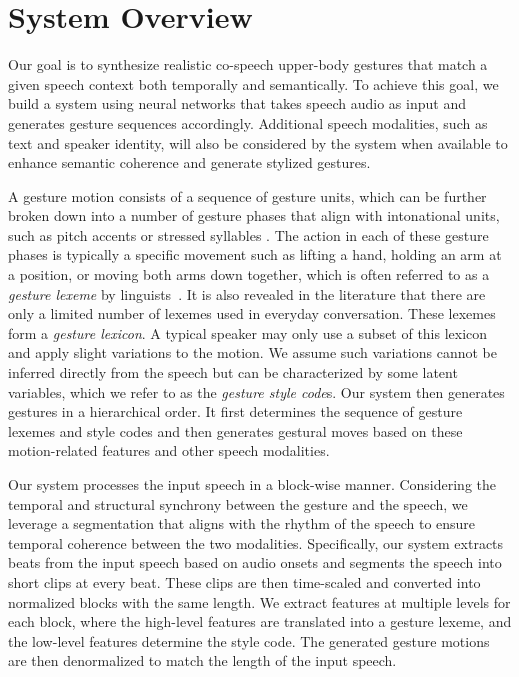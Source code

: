 \section{System Overview}
\label{sec:system_overview}
Our goal is to synthesize realistic co-speech upper-body gestures that match a given speech context both temporally and semantically. To achieve this goal, we build a system using neural networks that takes speech audio as input and generates gesture sequences accordingly. Additional speech modalities, such as text and speaker identity, will also be considered by the system when available to enhance semantic coherence and generate stylized gestures.

A gesture motion consists of a sequence of gesture units, which can be further broken down into a number of gesture phases that align with intonational units, such as pitch accents or stressed syllables \cite{kendon2004GestureBook,Loehr2012Temporal}. The action in each of these gesture phases is typically a specific movement such as lifting a hand, holding an arm at a position, or moving both arms down together, which is often referred to as a \emph{gesture lexeme} by linguists~\cite{Neff2008Gesture,Kipp2004_Gesture,Webb1996_Linguistic}. It is also revealed in the literature that there are only a limited number of lexemes used in everyday conversation. These lexemes form a \emph{gesture lexicon}. A typical speaker may only use a subset of this lexicon and apply slight variations to the motion. We assume such variations cannot be inferred directly from the speech but can be characterized by some latent variables, which we refer to as the \emph{gesture style code}s. Our system then generates gestures in a hierarchical order. It first determines the sequence of gesture lexemes and style codes and then generates gestural moves based on these motion-related features and other speech modalities.

Our system processes the input speech in a block-wise manner. Considering the temporal and structural synchrony between the gesture and the speech, we leverage a segmentation that aligns with the rhythm of the speech to ensure temporal coherence between the two modalities. Specifically, our system extracts beats from the input speech based on audio onsets and segments the speech into short clips at every beat. These clips are then time-scaled and converted into normalized blocks with the same length. We extract features at multiple levels for each block, where the high-level features are translated into a gesture lexeme, and the low-level features determine the style code. The generated gesture motions are then denormalized to match the length of the input speech.

